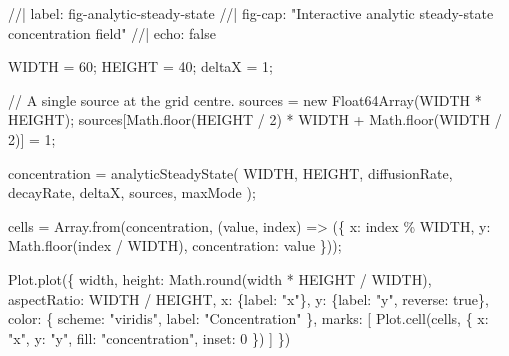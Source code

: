 \documentclass[
  letterpaper,
  DIV=11,
  numbers=noendperiod]{scrreprt}
\newenvironment{Shaded}{\begin{snugshade}}{\end{snugshade}}
\newcommand{\NormalTok}[1]{\textcolor[rgb]{0.00,0.23,0.31}{#1}}
\begin{document}
\begin{Shaded}
\begin{Highlighting}[]
\NormalTok{//| label: fig{-}analytic{-}steady{-}state}
\NormalTok{//| fig{-}cap: "Interactive analytic steady{-}state concentration field"}
\NormalTok{//| echo: false}

\NormalTok{WIDTH = 60;}
\NormalTok{HEIGHT = 40;}
\NormalTok{deltaX = 1;}

\NormalTok{// A single source at the grid centre.}
\NormalTok{sources = new Float64Array(WIDTH * HEIGHT);}
\NormalTok{sources[Math.floor(HEIGHT / 2) * WIDTH + Math.floor(WIDTH / 2)] = 1;}

\NormalTok{concentration = analyticSteadyState(}
\NormalTok{  WIDTH,}
\NormalTok{  HEIGHT,}
\NormalTok{  diffusionRate,}
\NormalTok{  decayRate,}
\NormalTok{  deltaX,}
\NormalTok{  sources,}
\NormalTok{  maxMode}
\NormalTok{);}

\NormalTok{cells = Array.from(concentration, (value, index) =\textgreater{} (\{}
\NormalTok{  x: index \% WIDTH,}
\NormalTok{  y: Math.floor(index / WIDTH),}
\NormalTok{  concentration: value}
\NormalTok{\}));}

\NormalTok{Plot.plot(\{}
\NormalTok{  width,}
\NormalTok{  height: Math.round(width * HEIGHT / WIDTH),}
\NormalTok{  aspectRatio: WIDTH / HEIGHT,}
\NormalTok{  x: \{label: "x"\},}
\NormalTok{  y: \{label: "y", reverse: true\},}
\NormalTok{  color: \{}
\NormalTok{    scheme: "viridis",}
\NormalTok{    label: "Concentration"}
\NormalTok{  \},}
\NormalTok{  marks: [}
\NormalTok{    Plot.cell(cells, \{}
\NormalTok{      x: "x",}
\NormalTok{      y: "y",}
\NormalTok{      fill: "concentration",}
\NormalTok{      inset: 0}
\NormalTok{    \})}
\NormalTok{  ]}
\NormalTok{\})}
\end{Highlighting}
\end{Shaded}


\chapter{}\label{section}


\chapter{}\label{section-1}


\chapter{}\label{section-2}
\end{document}
